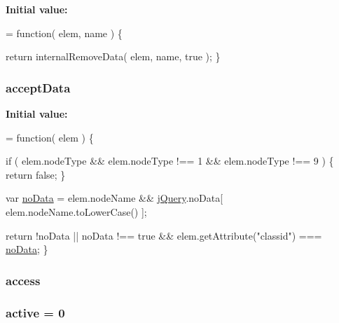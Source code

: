 {\bfseries Initial value\-:}
\begin{DoxyCode}
= \textcolor{keyword}{function}( elem, name ) \{

        \textcolor{keywordflow}{return} internalRemoveData( elem, name, \textcolor{keyword}{true} );
    \}
\end{DoxyCode}
\hypertarget{jquery-1_810_82-vsdoc_8js_a7d1dabc0af68f7b43c5cc81f1e61bf29}{
\subsubsection[{accept\-Data}]{ accept\-Data}}\label{jquery-1_810_82-vsdoc_8js_a7d1dabc0af68f7b43c5cc81f1e61bf29}
{\bfseries Initial value\-:}
\begin{DoxyCode}
= \textcolor{keyword}{function}( elem ) \{

        
        \textcolor{keywordflow}{if} ( elem.nodeType && elem.nodeType !== 1 && elem.nodeType !== 9 ) \{
            \textcolor{keywordflow}{return} \textcolor{keyword}{false};
        \}

        var \hyperlink{jquery-1_810_82-vsdoc_8js_ad32d84c9593cb0546704f6bd04d32386}{noData} = elem.nodeName && \hyperlink{jquery-1_810_82-vsdoc_8js_add5237586d970a38a81f990e8eb28c6c}{jQuery}.noData[ elem.nodeName.toLowerCase() ];

        
        \textcolor{keywordflow}{return} !noData || noData !== \textcolor{keyword}{true} && elem.getAttribute(\textcolor{stringliteral}{"classid"}) === 
      \hyperlink{jquery-1_810_82-vsdoc_8js_ad32d84c9593cb0546704f6bd04d32386}{noData};
    \}
\end{DoxyCode}
\hypertarget{jquery-1_810_82-vsdoc_8js_a130ad18d21e14ee566dbf4eb185f2bda}{
\subsubsection[{access}]{ access}}\label{jquery-1_810_82-vsdoc_8js_a130ad18d21e14ee566dbf4eb185f2bda}
\hypertarget{jquery-1_810_82-vsdoc_8js_ac7f6e8b6e2af70e6c0b36fc55e86f61b}{
\subsubsection[{active}]{ active = 0}}\label{jquery-1_810_82-vsdoc_8js_ac7f6e8b6e2af70e6c0b36fc55e86f61b}
